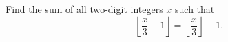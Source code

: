 Find the sum of all two-digit integers $x$ such that
\[\left\lfloor\dfrac x3-1\right\rfloor=\left\lfloor\dfrac x3\right\rfloor-1.\]
